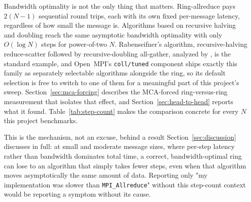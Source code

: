 Bandwidth optimality is not the only thing that matters. Ring-allreduce pays $2(N-1)$ sequential round trips, each with its own fixed per-message latency, regardless of how small the message is. Algorithms based on recursive halving and doubling reach the same asymptotic bandwidth optimality with only $O(\log N)$ steps for power-of-two $N$. Rabenseifner's algorithm, recursive-halving reduce-scatter followed by recursive-doubling all-gather, analyzed by \citet{thakur2005optimization}, is the standard example, and Open~MPI's \texttt{coll/tuned} component ships exactly this family as separately selectable algorithms alongside the ring, so its default selection is free to switch to one of them for a meaningful part of this project's sweep. Section~\ref{sec:mca-forcing} describes the MCA-forced ring-versus-ring measurement that isolates that effect, and Section~\ref{sec:head-to-head} reports what it found. Table~\ref{tab:step-count} makes the comparison concrete for every $N$ this project benchmarks.

\begin{table}[htbp]
\centering

\caption{Number of communication steps for $N = 2..16$: ring's $2(N-1)$ grows linearly in $N$, while recursive doubling's $\lceil\log_2 N\rceil$ and Rabenseifner's $2\lceil\log_2 N\rceil$ grow logarithmically. At $N=16$, ring takes roughly $3.75\times$ as many steps as Rabenseifner for the same asymptotic bandwidth optimality.}
\label{tab:step-count}
\end{table}

This is the mechanism, not an excuse, behind a result Section~\ref{sec:discussion} discusses in full: at small and moderate message sizes, where per-step latency rather than bandwidth dominates total time, a correct, bandwidth-optimal ring can lose to an algorithm that simply takes fewer steps, even when that algorithm moves asymptotically the same amount of data. Reporting only "my implementation was slower than \texttt{MPI\_Allreduce}" without this step-count context would be reporting a symptom without its cause.
